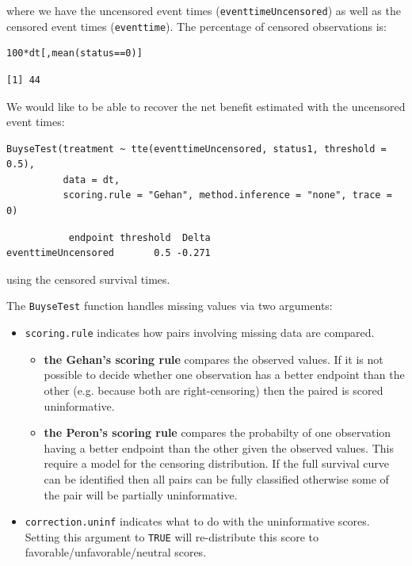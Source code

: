 \documentclass[12pt]{article}
\begin{document}
where we have the uncensored event times (\texttt{eventtimeUncensored}) as well as the censored event
times (\texttt{eventtime}). The percentage of censored observations is:
\lstset{language=r,label= ,caption= ,captionpos=b,numbers=none}
\begin{lstlisting}
100*dt[,mean(status==0)]
\end{lstlisting}

\begin{verbatim}
[1] 44
\end{verbatim}


We would like to be able to recover the net benefit estimated with the uncensored event times:
\lstset{language=r,label= ,caption= ,captionpos=b,numbers=none}
\begin{lstlisting}
BuyseTest(treatment ~ tte(eventtimeUncensored, status1, threshold = 0.5),
          data = dt,
          scoring.rule = "Gehan", method.inference = "none", trace = 0)
\end{lstlisting}

\begin{verbatim}
           endpoint threshold  Delta
eventtimeUncensored       0.5 -0.271
\end{verbatim}


using the censored survival times.

\clearpage

The \texttt{BuyseTest} function handles missing values via two arguments:
\begin{itemize}
\item \texttt{scoring.rule} indicates how pairs involving missing data are compared. 
\begin{itemize}
\item \textbf{the Gehan's scoring rule} compares the observed values. If it is
not possible to decide whether one observation has a better
endpoint than the other (e.g. because both are right-censoring)
then the paired is scored uninformative.
\item \textbf{the Peron's scoring rule} compares the probabilty of one
observation having a better endpoint than the other given the
observed values. This require a model for the censoring
distribution. If the full survival curve can be identified then
all pairs can be fully classified otherwise some of the pair
will be partially uninformative.
\end{itemize}
\item \texttt{correction.uninf} indicates what to do with the uninformative
scores. Setting this argument to \texttt{TRUE} will re-distribute this
score to favorable/unfavorable/neutral scores.
\end{itemize}
\end{document}
